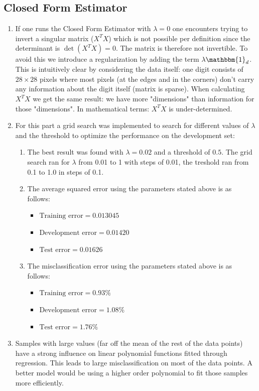 \documentclass[12pt]{article}
\begin{document}
\subsection{Closed Form Estimator}

\begin{enumerate}
	\item If one runs the Closed Form Estimator with $\lambda = 0$ one encounters trying to invert a singular matrix ($X^TX$) which is not possible per definition since the determinant is $\det(X^TX)=0$. The matrix is therefore not invertible. To avoid this we introduce a regularization by adding the term $\lambda\mathbbm{1}_d$. This is intuitively clear by considering the data itself: one digit consists of $28\times 28$ pixels where most pixels (at the edges and in the corners) don't carry any information about the digit itself (matrix is sparse). When calculating $X^TX$ we get the same result: we have more "dimensions" than information for those "dimensions". In mathematical terms: $X^TX$ is under-determined.
	\item For this part a grid search was implemented to search for different values of $\lambda$ and the threshold to optimize the performance on the development set:
		\begin{enumerate}[label=(\alph*)]
			\item The best result was found with $\lambda=0.02$ and a threshold of $0.5$. The grid search ran for $\lambda$ from 0.01 to 1 with steps of 0.01, the treshold ran from 0.1 to 1.0 in steps of 0.1.
			\item The average squared error using the parameters stated above is as follows:
				\begin{itemize}
					\item $\text{Training error}=0.013045$
					\item $\text{Development error}=0.01420$
					\item $\text{Test error}=0.01626$
				\end{itemize}
			\item The misclassification error using the parameters stated above is as follows:
			\begin{itemize}
				\item $\text{Training error}=0.93\%$
				\item $\text{Development error}=1.08\%$
				\item $\text{Test error}=1.76\%$
			\end{itemize}
		\end{enumerate}
	\item Samples with large values (far off the mean of the rest of the data points) have a strong influence on linear polynomial functions fitted through regression. This leads to large misclassification on most of the data points. A better model would be using a higher order polynomial to fit those samples more efficiently.
\end{enumerate}
\end{document}
